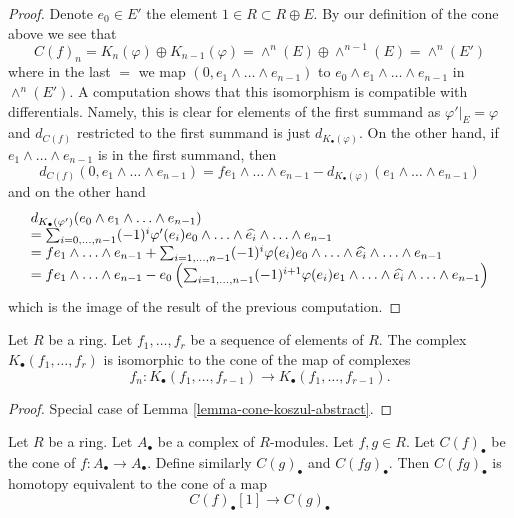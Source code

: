 \begin{proof}
Denote $e_0 \in E'$ the element $1 \in R \subset R \oplus E$.
By our definition of the cone above we see that
$$
C(f)_n = K_n(\varphi) \oplus K_{n - 1}(\varphi) =
\wedge^n(E) \oplus \wedge^{n - 1}(E) = \wedge^n(E')
$$
where in the last $=$ we map $(0, e_1 \wedge \ldots \wedge e_{n - 1})$
to $e_0 \wedge e_1 \wedge \ldots \wedge e_{n - 1}$ in $\wedge^n(E')$.
A computation shows that this isomorphism is compatible with
differentials. Namely, this is clear for elements of the first
summand as $\varphi'|_E = \varphi$ and $d_{C(f)}$ restricted to
the first summand is just $d_{K_\bullet(\varphi)}$.
On the other hand, if $e_1 \wedge \ldots \wedge e_{n - 1}$
is in the first summand, then
$$
d_{C(f)}(0, e_1 \wedge \ldots \wedge e_{n - 1}) =
fe_1 \wedge \ldots \wedge e_{n - 1}
- d_{K_\bullet(\varphi)}(e_1 \wedge \ldots \wedge e_{n - 1})
$$
and on the other hand
$$
\begin{matrix}
d_{K_\bullet(\varphi')}(e_0 \wedge e_1 \wedge \ldots \wedge e_{n - 1})
\hfill \\
= \sum\nolimits_{i = 0, \ldots, n - 1}
(-1)^i \varphi'(e_i)e_0 \wedge \ldots \wedge \widehat{e_i}
\wedge \ldots \wedge e_{n - 1} \hfill \\
= fe_1 \wedge \ldots \wedge e_{n - 1} +
\sum\nolimits_{i = 1, \ldots, n - 1}
(-1)^i \varphi(e_i)e_0 \wedge \ldots \wedge \widehat{e_i}
\wedge \ldots \wedge e_{n - 1} \hfill \\
= fe_1 \wedge \ldots \wedge e_{n - 1} -
e_0 \left(\sum\nolimits_{i = 1, \ldots, n - 1}
(-1)^{i + 1} \varphi(e_i)e_1 \wedge \ldots \wedge \widehat{e_i}
\wedge \ldots \wedge e_{n - 1}\right)
\end{matrix}
$$
which is the image of the result of the previous computation.
\end{proof}

\begin{lemma}
\label{lemma-cone-koszul}
Let $R$ be a ring. Let $f_1, \ldots, f_r$ be a sequence of elements
of $R$. The complex $K_\bullet(f_1, \ldots, f_r)$ is isomorphic to the
cone of the map of complexes
$$
f_n :
K_\bullet(f_1, \ldots, f_{r - 1})
\longrightarrow
K_\bullet(f_1, \ldots, f_{r - 1}).
$$
\end{lemma}

\begin{proof}
Special case of
Lemma \ref{lemma-cone-koszul-abstract}.
\end{proof}

\begin{lemma}
\label{lemma-cone-squared}
Let $R$ be a ring. Let $A_\bullet$ be a complex of $R$-modules.
Let $f, g \in R$. Let $C(f)_\bullet$ be the cone of
$f : A_\bullet \to A_\bullet$. Define similarly $C(g)_\bullet$ and
$C(fg)_\bullet$. Then $C(fg)_\bullet$ is homotopy equivalent to the
cone of a map
$$
C(f)_\bullet[1] \longrightarrow C(g)_\bullet
$$
\end{lemma}

